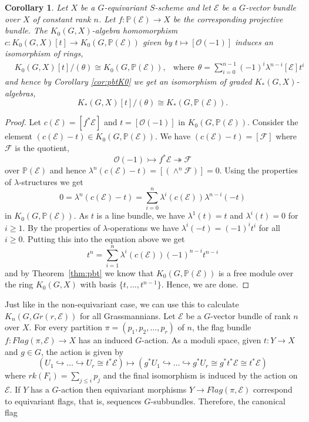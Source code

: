 \documentclass[11pt,twoside]{amsart}
\newtheorem{corollary}[theorem]{Corollary}
\theoremstyle{definition}
\theoremstyle{remark}
\numberwithin{equation}{section}
\newcommand{\mc}{\mathcal}
\newcommand{\into}{\hookrightarrow}
\newcommand{\mono}{\rightarrowtail}
\newcommand{\epi}{\twoheadrightarrow}
\begin{document}
	\begin{corollary}
		Let $X$ be a $G$-equivariant $S$-scheme and let $\mc{E}$ be a $G$-vector bundle over $X$ of constant rank $n$. Let $f:\mathbb{P}(\mc{E})\to X$ be the corresponding projective bundle. The $K_0(G,X)$-algebra homomorphism $c:K_0(G, X)[t]\to K_0(G, \mathbb{P}(\mc{E}))$ given by $t\mapsto [\mc{O}(-1)]$ induces an isomorphism of rings,
		\begin{align*}
			& K_0(G,X)[t]/(\theta) \cong K_0(G,\mathbb{P}(\mc{E})),	&\mathrm{where}\:\: \theta= \sum_{i=0}^{n-1} (-1)^i \lambda^{n-i} [\mc{E}]t^i	
			\end{align*}	 
			and hence by Corollary \ref{cor:pbtK0} we get an isomorphism of graded $K_*(G, X)$-algebras, 
			\[K_*(G, X)[t]/(\theta) \cong K_*(G, \mathbb{P}(\mc{E})).\]
		\end{corollary}	
	\begin{proof}
		Let $c(\mc{E})=[f^*\mc{E}]$ and $t=[\mc{O}(-1)]$ in $K_0(G, \mathbb{P}(\mc{E}))$. Consider the element $(c(\mc{E})-t)\in K_0(G, \mathbb{P}(\mc{E}))$. We have $(c(\mc{E})-t) = [\mc{F}]$ where $\mc{F}$ is the quotient,
		\[ \mc{O}(-1)\mono f^*\mc{E}\epi \mc{F} \]
		over $\mathbb{P}(\mc{E})$ and hence $\lambda^n(c(\mc{E})-t)= [(\wedge^n\mc{F})]=0$. Using the properties of $\lambda$-structures we get 
		\[ 0=\lambda^n(c(\mc{E})-t)=\sum_{i=0}^{n}\lambda^i(c(\mc{E}))\lambda^{n-i}(-t)\] 
		in $K_0(G, \mathbb{P}(\mc{E}))$. As $t$ is a line bundle, we have $\lambda^1(t)=t$ and $\lambda^i(t)=0$ for $i\geq 1$. By the properties of $\lambda$-operations we have $\lambda^{i}(-t)=(-1)^{i}t^i$ for all $i\geq 0$. Putting this into the equation above we get 
		\[ t^n=\sum_{i=1}^{n}\lambda^i(c(\mc{E}))(-1)^{n-i}t^{n-i} \]
		 and by Theorem~\ref{thm:pbt} we know that $K_0(G,\mathbb{P}(\mc{E}))$ is a free module over the ring $K_0(G,X)$ with basis $ \{t,\ldots,t^{n-1} \} $. Hence, we are done.
		\end{proof}
	Just like in the non-equivariant case, we can use this to calculate $K_n(G, Gr(r,\mc{E}))$ for all Grassmannians. Let $\mathcal{E}$ be a $G$-vector bundle of rank $n$ over $X$. For every partition $\pi=(p_1,p_2,\ldots,p_r)$ of $n$, the flag bundle $f:Flag(\pi,\mathcal{E})\to X$ has an induced $G$-action. As a moduli space, given $t:Y\to X$ and $g\in G$, the action is given by 
    \[ (U_1\into\ldots\into U_r\cong t^*\mathcal{E}) \mapsto ( g^*U_1\into\ldots\into g^*U_r\cong g^*t^*\mathcal{E}\cong t^*\mathcal{E}) \] where $rk(F_i)=\sum_{j\leq i} p_j$ and the final isomorphism is induced by the action on $\mathcal{E}$. If $Y$ has a $G$-action then equivariant morphisms $Y\to Flag(\pi, \mathcal{E})$ correspond to equivariant flags, that is, sequences $G$-subbundles. Therefore, the canonical flag
\end{document}
